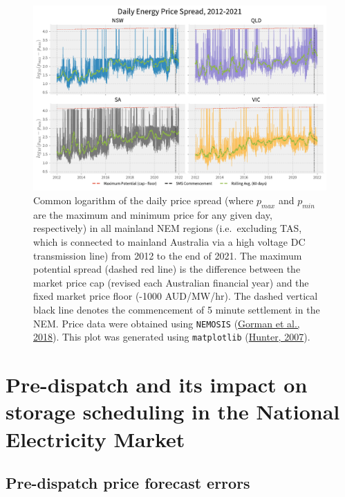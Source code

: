 \documentclass[12pt,a4paper,]{report}
\begin{document}
\begin{figure}
\hypertarget{fig:nem_daily_price_spreads}{%
\centering
\includegraphics{source/figures/historical_daily_price_spreads.pdf}
\caption{Common logarithm of the daily price spread (where \(p_{max}\)
and \(p_{min}\) are the maximum and minimum price for any given day,
respectively) in all mainland NEM regions (i.e.~excluding TAS, which is
connected to mainland Australia via a high voltage DC transmission line)
from 2012 to the end of 2021. The maximum potential spread (dashed red
line) is the difference between the market price cap (revised each
Australian financial year) and the fixed market price floor (-1000
AUD/MW/hr). The dashed vertical black line denotes the commencement of 5
minute settlement in the NEM. Price data were obtained using
\texttt{NEMOSIS}
(\protect\hyperlink{ref-gormanNEMOSISNEMOpen2018}{Gorman et al., 2018}).
This plot was generated using \texttt{matplotlib}
(\protect\hyperlink{ref-hunterMatplotlib2DGraphics2007}{Hunter,
2007}).}\label{fig:nem_daily_price_spreads}
}
\end{figure}

\hypertarget{sec:info-case_study}{%
\section{Pre-dispatch and its impact on storage scheduling in the
National Electricity Market}\label{sec:info-case_study}}

\hypertarget{sec:info-case_study-price_forecast_errors}{%
\subsection{Pre-dispatch price forecast
errors}\label{sec:info-case_study-price_forecast_errors}}
\end{document}
